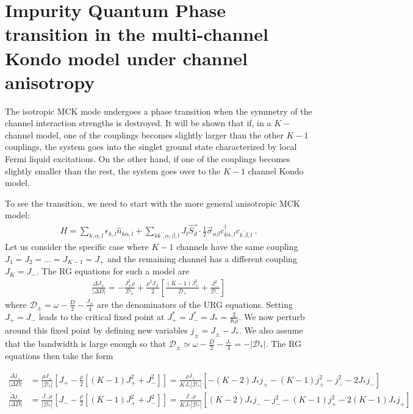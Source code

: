 \documentclass[reprint,prb,superscriptaddress]{revtex4-2}
\begin{document}
\section{Impurity Quantum Phase transition in the multi-channel Kondo model under channel anisotropy}
The isotropic MCK mode undergoes a phase transition when the symmetry of the channel interaction strengths is destroyed. It will be shown that if, in a \(K-\)channel model, one of the couplings becomes slightly larger than the other \(K-1\) couplings, the system goes into the singlet ground state characterized by local Fermi liquid excitations. On the other hand, if one of the couplings becomes slightly smaller than the rest, the system goes over to the \(K-1\) channel Kondo model.

To see the transition, we need to start with the more general anisotropic MCK model:
\begin{align}
	H = \sum_{k,\alpha,l}\epsilon_{k,l} \hat n_{k\alpha,l} + \sum_{kk^\prime,\alpha,\beta,l}J_l \vec{S_d}\cdot\frac{1}{2}\vec{\sigma}_{\alpha\beta}c_{k\alpha,l}^\dagger c_{k^\prime\beta, l}~.
\end{align}
Let us consider the specific case where \(K-1\) channels have the same coupling \(J_1 = J_2 = ... = J_{K-1} = J_+\) and the remaining channel has a different coupling \(J_K = J_-\). The RG equations for such a model are
\begin{align}
	\frac{\Delta J_\pm}{|\Delta D|} = -\frac{J_\pm^2 \rho}{\mathcal{D}_\pm} + \frac{\rho^2 J_\pm}{2}\left[\frac{(K-1)J_+^2}{\mathcal{D}_+} + \frac{J_-^2}{\mathcal{D}_-}\right]
\end{align}
where \(\mathcal{D}_\pm = \omega - \frac{D}{2} - \frac{J_\pm}{4}\) are the denominators of the URG equations.
Setting \(J_+ = J_-\) leads to the critical fixed point at \(J_+^* = J_-^* = J_* = \frac{2}{K \rho}\). We now perturb around this fixed point by defining new variables \(j_\pm = J_\pm - J_*\). We also assume that the bandwidth is large enough so that \(\mathcal{D}_\pm \simeq \omega - \frac{D}{2} - \frac{J_*}{4} = -|\mathcal{D}_*|\). The RG equations then take the form
\begin{widetext}
\begin{align}
	\frac{\Delta j_+}{|\Delta D|} &= \frac{\rho J_+}{ |\mathcal{D}_*|}\left[J_+ - \frac{\rho}{2}\left[(K-1)J_+^2 + J_-^2\right]\right] = \frac{\rho J_+}{K J_*|\mathcal{D}_*|}\left[-\left(K - 2\right)J_*j_+ - (K-1)j_+^2 - j_-^2 - 2J_* j_-\right]\\
	\frac{\Delta j_-}{|\Delta D|} &= \frac{J_- \rho}{|\mathcal{D}_*|}\left[J_- - \frac{\rho}{2}\left[(K-1)J_+^2 + J_-^2\right]\right] = \frac{J_- \rho}{K J_*|\mathcal{D}_*|}\left[\left(K - 2\right)J_*j_-  - j_-^2 - (K-1)j_+^2 - 2(K-1)J_* j_+\right]\\
\end{align}
\end{widetext}
\end{document}
